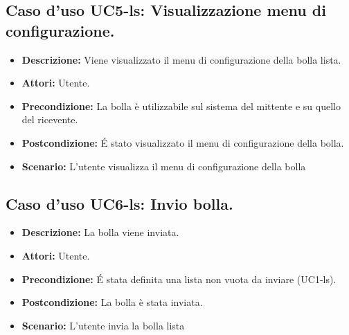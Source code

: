 \subsection{Caso d'uso UC5-ls: Visualizzazione menu di configurazione.}
\begin{itemize}
\item[]\textbf{Descrizione:} Viene visualizzato il menu di configurazione della bolla lista.
\item[]\textbf{Attori:} Utente. 
\item[]\textbf{Precondizione:} La bolla è utilizzabile sul sistema del mittente e su quello del ricevente. 
\item[]\textbf{Postcondizione:} \'E stato visualizzato il menu di configurazione della bolla. 
\item[]\textbf{Scenario:}
L'utente visualizza il menu di configurazione della bolla 
\end{itemize}

\subsection{Caso d'uso UC6-ls: Invio bolla.}
\begin{itemize}
\item[]\textbf{Descrizione:} La bolla viene inviata.
\item[]\textbf{Attori:} Utente. 
\item[]\textbf{Precondizione:} \'E stata definita una lista non vuota da inviare (UC1-ls). 
\item[]\textbf{Postcondizione:} La bolla è stata inviata. 
\item[]\textbf{Scenario:}
L'utente invia la bolla lista 
\end{itemize}

\clearpage


